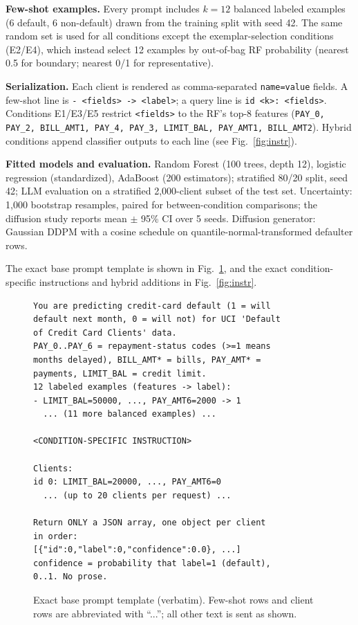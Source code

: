 \documentclass[conference]{IEEEtran}
\begin{document}
\textbf{Few-shot examples.} Every prompt includes $k{=}12$ balanced labeled examples (6 default, 6 non-default) drawn from the training split with seed 42. The same random set is used for all conditions except the exemplar-selection conditions (E2/E4), which instead select 12 examples by out-of-bag RF probability (nearest 0.5 for boundary; nearest 0/1 for representative).

\textbf{Serialization.} Each client is rendered as comma-separated \texttt{name=value} fields. A few-shot line is \texttt{- <fields> -> <label>}; a query line is \texttt{id <k>: <fields>}. Conditions E1/E3/E5 restrict \texttt{<fields>} to the RF's top-8 features (\texttt{PAY\_0, PAY\_2, BILL\_AMT1, PAY\_4, PAY\_3, LIMIT\_BAL, PAY\_AMT1, BILL\_AMT2}). Hybrid conditions append classifier outputs to each line (see Fig.~\ref{fig:instr}).

\textbf{Fitted models and evaluation.} Random Forest (100 trees, depth 12), logistic regression (standardized), AdaBoost (200 estimators); stratified 80/20 split, seed 42; LLM evaluation on a stratified 2{,}000-client subset of the test set. Uncertainty: 1{,}000 bootstrap resamples, paired for between-condition comparisons; the diffusion study reports mean $\pm$ 95\% CI over 5 seeds. Diffusion generator: Gaussian DDPM with a cosine schedule on quantile-normal-transformed defaulter rows.

The exact base prompt template is shown in Fig.~\ref{fig:prompt}, and the exact condition-specific instructions and hybrid additions in Fig.~\ref{fig:instr}.

\begin{figure}[!t]
\footnotesize
\begin{verbatim}
You are predicting credit-card default (1 = will
default next month, 0 = will not) for UCI 'Default
of Credit Card Clients' data.
PAY_0..PAY_6 = repayment-status codes (>=1 means
months delayed), BILL_AMT* = bills, PAY_AMT* =
payments, LIMIT_BAL = credit limit.
12 labeled examples (features -> label):
- LIMIT_BAL=50000, ..., PAY_AMT6=2000 -> 1
  ... (11 more balanced examples) ...

<CONDITION-SPECIFIC INSTRUCTION>

Clients:
id 0: LIMIT_BAL=20000, ..., PAY_AMT6=0
  ... (up to 20 clients per request) ...

Return ONLY a JSON array, one object per client
in order:
[{"id":0,"label":0,"confidence":0.0}, ...]
confidence = probability that label=1 (default),
0..1. No prose.
\end{verbatim}
\caption{Exact base prompt template (verbatim). Few-shot rows and client rows are abbreviated with ``...''; all other text is sent as shown.}
\label{fig:prompt}
\end{figure}
\end{document}

